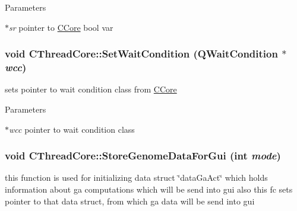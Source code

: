 \begin{DoxyParams}{Parameters}
\item[{\em $\ast$sr}]pointer to \hyperlink{classCCore}{CCore} bool var \end{DoxyParams}
\hypertarget{classCThreadCore_a68d67f8c9b9cb9592c014f3c8c27c5d7}{
\subsubsection[{SetWaitCondition}]{\setlength{\rightskip}{0pt plus 5cm}void CThreadCore::SetWaitCondition (QWaitCondition $\ast$ {\em wcc})}}
\label{classCThreadCore_a68d67f8c9b9cb9592c014f3c8c27c5d7}
sets pointer to wait condition class from \hyperlink{classCCore}{CCore}


\begin{DoxyParams}{Parameters}
\item[{\em $\ast$wcc}]pointer to wait condition class \end{DoxyParams}
\hypertarget{classCThreadCore_aecc92d11204f96cd0c658cdc3b925f58}{
\subsubsection[{StoreGenomeDataForGui}]{\setlength{\rightskip}{0pt plus 5cm}void CThreadCore::StoreGenomeDataForGui (int {\em mode})}}
\label{classCThreadCore_aecc92d11204f96cd0c658cdc3b925f58}
this function is used for initializing data struct \char`\"{}dataGaAct\char`\"{} which holds information about ga computations which will be send into gui also this fc sets pointer to that data struct, from which ga data will be send into gui



